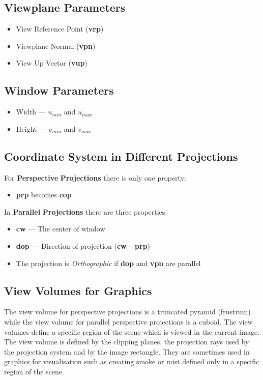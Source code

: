\documentclass{article}
\begin{document}
\subsection{Viewplane Parameters}
\begin{itemize}
	\item View Reference Point ({\bf vrp})
	\item Viewplane Normal ({\bf vpn})
	\item View Up Vector ({\bf vup})
\end{itemize}
\subsection{Window Parameters}
\begin{itemize}
	\item Width --- $u_{min}$ and $u_{max}$
	\item Height --- $v_{min}$ and $v_{max}$
\end{itemize}
\subsection{Coordinate System in Different Projections}
For {\bf Perspective} {\bf Projections} there is only one property:
\begin{itemize} 
	\item {\bf prp} becomes {\bf cop}
\end{itemize}
In {\bf Parallel} {\bf Projections} there are three properties:
\begin{itemize}
	\item {\bf cw} --- The center of window
	\item {\bf dop} --- Direction of projection ({\bf cw} -- {\bf prp})
	\item The projection is {\it Orthographic} if {\bf dop} and {\bf vpn} are parallel
\end{itemize}

\subsection{View Volumes for Graphics}
The view volume for perspective projections is a truncated pyramid (frustrum) while the view volume for parallel perspective projections is a cuboid.
The view volumes define a specific region of the scene which is viewed in the current image. 
The view volume is defined by the clipping planes, the projection rays used by the projection system and by the image rectangle.
They are sometimes used in graphics for visualisation such as creating smoke or mist defined only in a specific region of the scene.
\end{document}
